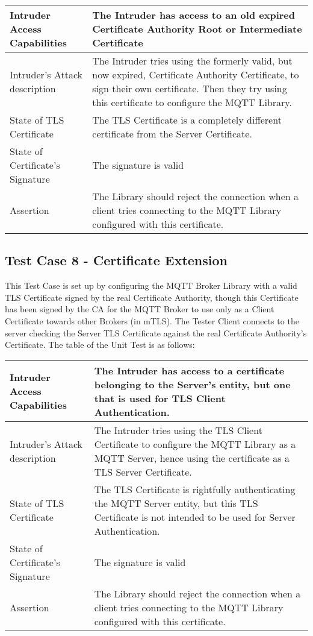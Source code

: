 \documentclass[binding=0.6cm,noexaminfo]{sapthesis}
\begin{document}
\begin{center}
\begin{tabular}{| p{6cm} | p{6cm} |}
\hline
Intruder Access Capabilities & The Intruder has access to an old expired Certificate Authority Root or Intermediate Certificate \\
\hline
Intruder’s Attack description & The Intruder tries using the formerly valid, but now expired, Certificate Authority Certificate, to sign their own certificate. Then they try using this certificate to configure the MQTT Library. \\
\hline
State of TLS Certificate & The TLS Certificate is a completely different certificate from the Server Certificate. \\
\hline
State of Certificate’s Signature & The signature is valid \\
\hline
Assertion & The Library should reject the connection when a client tries connecting to the MQTT Library configured with this certificate. \\
\hline
\end{tabular}
\end{center}

\subsection{Test Case 8 - Certificate Extension}
This Test Case is set up by configuring the MQTT Broker Library with a valid TLS Certificate signed by the real Certificate Authority, though this Certificate has been signed by the CA for the MQTT Broker to use only as a Client Certificate towards other Brokers (in mTLS). The Tester Client connects to the server checking the Server TLS Certificate against the real Certificate Authority’s Certificate. The table of the Unit Test is as follows:

\begin{center}
\begin{tabular}{| p{6cm} | p{6cm} |}
\hline
Intruder Access Capabilities & The Intruder has access to a certificate belonging to the Server’s entity, but one that is used for TLS Client Authentication. \\
\hline
Intruder’s Attack description & The Intruder tries using the TLS Client Certificate to configure the MQTT Library as a MQTT Server, hence using the certificate as a TLS Server Certificate. \\
\hline
State of TLS Certificate & The TLS Certificate is rightfully authenticating the MQTT Server entity, but this TLS Certificate is not intended to be used for Server Authentication. \\
\hline
State of Certificate’s Signature & The signature is valid \\
\hline
Assertion & The Library should reject the connection when a client tries connecting to the MQTT Library configured with this certificate. \\
\hline
\end{tabular}
\end{center}
\end{document}
